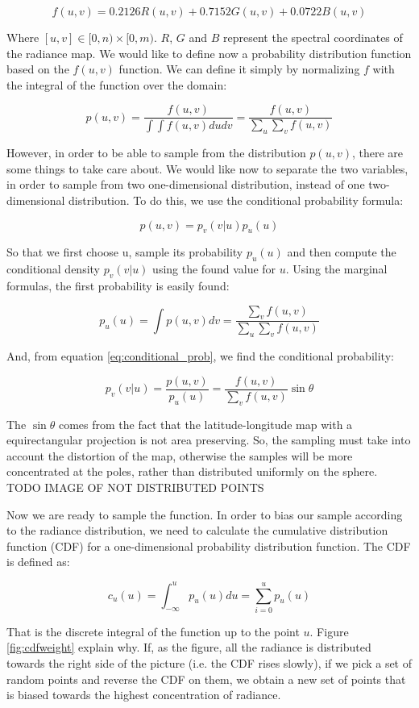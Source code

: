 $$
f(u,v) = 0.2126 R(u,v) + 0.7152 G(u,v) + 0.0722 B(u,v)
$$

Where $[u,v] \in [0,n)\times [0,m)$. $R$, $G$ and $B$ represent the spectral coordinates of the radiance map. We would like to define now a probability distribution function based on the $f(u,v)$ function. We can define it simply by normalizing $f$ with the integral of the function over the domain:

$$
p(u,v) = \frac{f(u,v)}{\int \int f(u,v) du dv} = \frac{f(u,v)}{\sum_u \sum_v f(u,v)}
$$

However, in order to be able to sample from the distribution $p(u,v)$, there are some things to take care about. We would like now to separate the two variables, in order to sample from two one-dimensional distribution, instead of one two-dimensional distribution. To do this, we use the conditional probability formula:

$$
p(u,v) = p_v(v|u) p_u(u)
\label{eq:conditional_prob}
$$

So that we first choose u, sample its probability $p_u(u)$ and then compute the conditional density $p_v(v|u)$ using the found value for $u$. Using the marginal formulas, the first probability is easily found:

$$
p_u(u) =\int p(u,v) dv = \frac{\sum_v f(u,v)}{\sum_u \sum_v f(u,v)}
$$

And, from equation \ref{eq:conditional_prob}, we find the conditional probability:

$$
p_v(v|u) = \frac{p(u,v)}{p_u(u)} = \frac{f(u,v)}{\sum_v f(u,v)} \sin \theta
$$

The $\sin \theta$ comes from the fact that the latitude-longitude map with a equirectangular projection is not area preserving. So, the sampling must take into account the distortion of the map, otherwise the samples will be more concentrated at the poles, rather than distributed uniformly on the sphere. TODO IMAGE OF NOT DISTRIBUTED POINTS

Now we are ready to sample the function. In order to bias our sample according to the radiance distribution, we need to calculate the cumulative distribution function (CDF) for a one-dimensional probability distribution function. The CDF is defined as:

$$
c_u(u) = \int_{-\infty}^{u} p_u(u) du = \sum_{i=0}^u p_u(u)
$$

That is the discrete integral of the function up to the point $u$. Figure \ref{fig:cdfweight} explain why. If, as the figure, all the radiance is distributed towards the right side of the picture (i.e. the CDF rises slowly), if we pick a set of random points and reverse the CDF on them, we obtain a new set of points that is biased towards the highest concentration of radiance.

